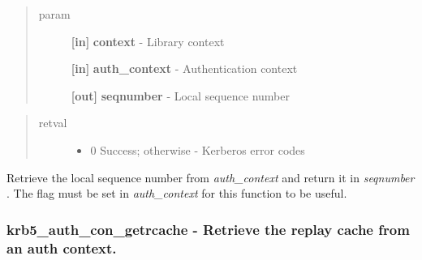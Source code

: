 \documentclass[letterpaper,10pt,english]{sphinxmanual}
\begin{document}
\begin{fulllineitems}
\label{appdev/refs/api/krb5_auth_con_getlocalseqnumber:krb5_auth_con_getlocalseqnumber}
\end{fulllineitems}

\begin{quote}\begin{description}
\item[{param}] \leavevmode
\textbf{{[}in{]}} \textbf{context} - Library context

\textbf{{[}in{]}} \textbf{auth\_context} - Authentication context

\textbf{{[}out{]}} \textbf{seqnumber} - Local sequence number

\end{description}\end{quote}
\begin{quote}\begin{description}
\item[{retval}] \leavevmode\begin{itemize}
\item {} 
0   Success; otherwise - Kerberos error codes

\end{itemize}

\end{description}\end{quote}

Retrieve the local sequence number from \emph{auth\_context} and return it in \emph{seqnumber} . The {\hyperref[appdev/refs/macros/KRB5_AUTH_CONTEXT_DO_SEQUENCE:KRB5_AUTH_CONTEXT_DO_SEQUENCE]{}} flag must be set in \emph{auth\_context} for this function to be useful.


\subsubsection{krb5\_auth\_con\_getrcache -  Retrieve the replay cache from an auth context.}
\label{appdev/refs/api/krb5_auth_con_getrcache:krb5-auth-con-getrcache-retrieve-the-replay-cache-from-an-auth-context}\label{appdev/refs/api/krb5_auth_con_getrcache::doc}
\end{document}
